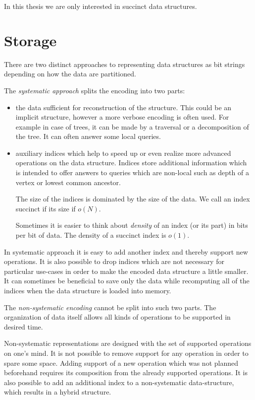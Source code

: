 \bigbreak

In this thesis we are only interested in succinct data structures.

\section{Storage}

There are two distinct approaches to representing data structures as bit strings depending on how the data are partitioned.

The \emph{systematic approach} splits the encoding into two parts:
\begin{itemize}
	\item the data sufficient for reconstruction of the structure.
	This could be an implicit structure, however a more verbose encoding is often used.
	For example in case of trees, it can be made by a traversal or a decomposition of the tree.
	It can often answer some local queries.
	\item auxiliary indices which help to speed up or even realize more advanced operations on the data structure.
	Indices store additional information which is intended to offer answers to queries which are non-local such as depth of a vertex or lowest common ancestor.

	The size of the indices is dominated by the size of the data.	
	We call an index succinct if its size if $o(N)$.
	
	Sometimes it is easier to think about \emph{density} of an index (or its part) in bits per bit of data.
	The density of a succinct index is $o(1)$.
\end{itemize}

In systematic approach it is easy to add another index and thereby support new operations.
It is also possible to drop indices which are not necessary for particular use-cases in order to make the encoded data structure a little smaller.
It can sometimes be beneficial to save only the data while recomputing all of the indices when the data structure is loaded into memory.

\bigbreak

The \emph{non-systematic encoding} cannot be split into such two parts.
The organization of data itself allows all kinds of operations to be supported in desired time.

Non-systematic representations are designed with the set of supported operations on one's mind.
It is not possible to remove support for any operation in order to spare some space.
Adding support of a new operation which was not planned beforehand requires its composition from the already supported operations.
It is also possible to add an additional index to a non-systematic data-structure, which results in a hybrid structure.

